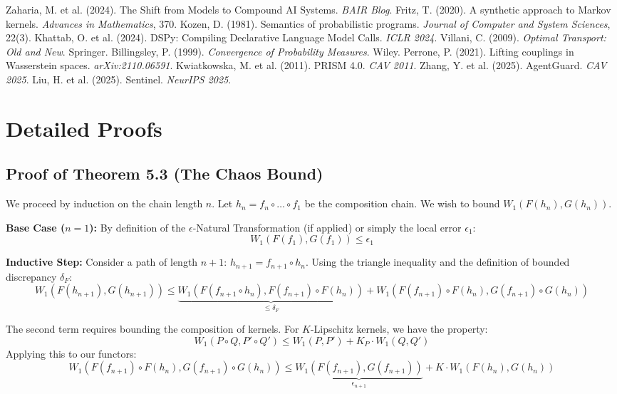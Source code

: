 \documentclass[11pt]{article}
\theoremstyle{definition}
\begin{document}
\newpage

\begin{thebibliography}{99}
 Zaharia, M. et al. (2024). The Shift from Models to Compound AI Systems. \textit{BAIR Blog}.
 Fritz, T. (2020). A synthetic approach to Markov kernels. \textit{Advances in Mathematics}, 370.
 Kozen, D. (1981). Semantics of probabilistic programs. \textit{Journal of Computer and System Sciences}, 22(3).
 Khattab, O. et al. (2024). DSPy: Compiling Declarative Language Model Calls. \textit{ICLR 2024}.
 Villani, C. (2009). \textit{Optimal Transport: Old and New}. Springer.
 Billingsley, P. (1999). \textit{Convergence of Probability Measures}. Wiley.
 Perrone, P. (2021). Lifting couplings in Wasserstein spaces. \textit{arXiv:2110.06591}.
 Kwiatkowska, M. et al. (2011). PRISM 4.0. \textit{CAV 2011}.
 Zhang, Y. et al. (2025). AgentGuard. \textit{CAV 2025}.
 Liu, H. et al. (2025). Sentinel. \textit{NeurIPS 2025}.
\end{thebibliography}

\newpage
\appendix
\section{Detailed Proofs}

\subsection{Proof of Theorem 5.3 (The Chaos Bound)}
 We proceed by induction on the chain length $n$.
Let $h_n = f_n \circ \dots \circ f_1$ be the composition chain. We wish to bound $W_1(F(h_n), G(h_n))$.

\textbf{Base Case ($n=1$):}
By definition of the $\epsilon$-Natural Transformation (if applied) or simply the local error $\epsilon_1$:
$$ W_1(F(f_1), G(f_1)) \le \epsilon_1 $$

\textbf{Inductive Step:}
Consider a path of length $n+1$: $h_{n+1} = f_{n+1} \circ h_n$.
Using the triangle inequality and the definition of bounded discrepancy $\delta_F$:
$$ W_1(F(h_{n+1}), G(h_{n+1})) \le \underbrace{W_1(F(f_{n+1} \circ h_n), F(f_{n+1}) \circ F(h_n))}_{\le \delta_F} + W_1(F(f_{n+1}) \circ F(h_n), G(f_{n+1}) \circ G(h_n)) $$

The second term requires bounding the composition of kernels. For $K$-Lipschitz kernels, we have the property:
$$ W_1(P \circ Q, P' \circ Q') \le W_1(P, P') + K_P \cdot W_1(Q, Q') $$
Applying this to our functors:
$$ W_1(F(f_{n+1}) \circ F(h_n), G(f_{n+1}) \circ G(h_n)) \le \underbrace{W_1(F(f_{n+1}), G(f_{n+1}))}_{\epsilon_{n+1}} + K \cdot W_1(F(h_n), G(h_n)) $$
\end{document}
